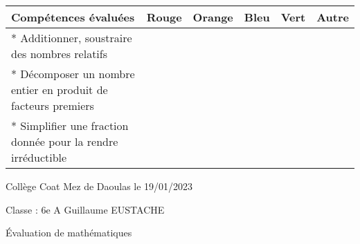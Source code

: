 \documentclass[a4paper,12pt,fleqn]{article}
\begin{document}
\begin{footnotesize}

\begin{center}

\begin{tabular}{|p{120mm}|p{8mm}|p{10mm}|p{8mm}|p{8mm}|p{8mm}|}

\hline
\textbf{Compétences évaluées} & \textbf{Rouge} & \textbf{Orange} & \textbf{Bleu} & \textbf{Vert} & \textbf{Autre} \\
\hline


*  Additionner, soustraire des nombres relatifs  & & & & & \\ 
\hline
*  Décomposer un nombre entier en produit de facteurs premiers  & & & & & \\ 
\hline
*  Simplifier une fraction donnée pour la rendre irréductible  & & & & & \\ 
\hline
\end{tabular}
\end{center}
\end{footnotesize}
 \par 
\medskip
 \par 
\medskip
 \par 
\medskip
\newpage
\setcounter{exo}{0}


Collège Coat Mez de Daoulas  \hfill  le 19/01/2023

Classe : 6e A \hfill Guillaume EUSTACHE

\begin{center}
\begin{LARGE} Évaluation de mathématiques \end{LARGE}
\end{center}

\end{document}
